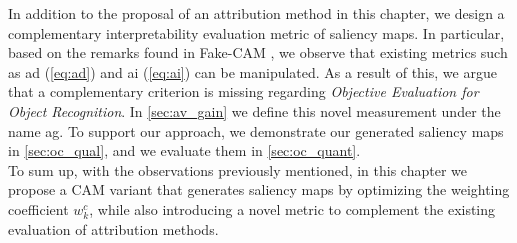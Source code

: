 \noindent In addition to the proposal of an attribution method in this chapter, we
design a complementary interpretability evaluation metric of saliency maps. In particular, 
based on the remarks found in Fake-CAM \autocite{poppi2021revisiting}, we observe that 
existing metrics such as \gls{ad} (\ref{eq:ad}) and \gls{ai} (\ref{eq:ai}) can be manipulated. As a 
result of this, we argue that a complementary criterion is missing regarding \textit{Objective 
Evaluation for Object Recognition}. In \autoref{sec:av_gain} we define this novel measurement 
under the name \gls{ag}. To support our approach, we demonstrate our generated saliency maps in 
\autoref{sec:oc_qual}, and we evaluate them in \autoref{sec:oc_quant}.\\

\noindent To sum up, with the observations previously mentioned, in this chapter we propose a CAM 
variant that generates saliency maps by optimizing the weighting coefficient $w_k^c$, while also 
introducing a novel metric to complement the existing evaluation of attribution methods.\\











